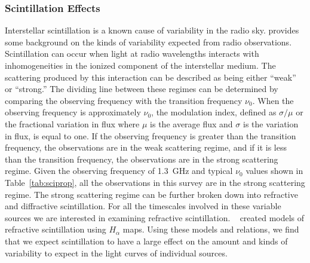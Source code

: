 \documentclass[12pt]{article}
\begin{document}
\subsubsection{Scintillation Effects}
Interstellar scintillation is a known cause of variability in the radio sky. \citet{1998MNRAS.294..307W} provides some background on the kinds of variability expected from radio observations. Scintillation can occur when light at radio wavelengths interacts with inhomogeneities in the ionized component of the interstellar medium. The scattering produced by this interaction can be described as being either ``weak'' or ``strong.'' The dividing line between these regimes can be determined by comparing the observing frequency with the transition frequency $\nu_0$. When the observing frequency is approximately $\nu_0$, the modulation index, defined as $\sigma/\mu$ or the fractional variation in flux where $\mu$ is the average flux and $\sigma$ is the variation in flux, is equal to one. If the observing frequency is greater than the transition frequency, the observations are in the weak scattering regime, and if it is less than the transition frequency, the observations are in the strong scattering regime. Given the observing frequency of 1.3~GHz and typical $\nu_0$ values shown in Table~\ref{tab:sciprop}, all the observations in this survey are in the strong scattering regime. The strong scattering regime can be further broken down into refractive and diffractive scintillation. For all the timescales involved in these variable sources we are interested in examining refractive scintillation. ~\citet{2019arXiv190708395H} created models of refractive scintillation using $H_{\alpha}$ maps. Using these models and relations, we find that we expect scintillation to have a large effect on the amount and kinds of variability to expect in the light curves of individual sources. 
\end{document}
